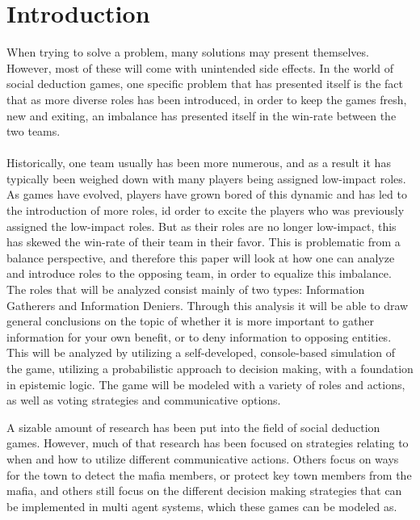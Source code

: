 \section{Introduction}
When trying to solve a problem, many solutions may present themselves. However, 
most of these will come with unintended side effects. In the world of social deduction games, one specific problem that has presented itself is the fact that as more diverse roles has been introduced, in order to keep the games fresh, new and exiting, an imbalance has presented itself in the win-rate between the two teams. \\ \\
Historically, one team usually has been more numerous, and as a result it has typically been weighed down with many players being assigned low-impact roles. As games have evolved, players have grown bored of this dynamic and has led to the introduction of more roles, id order to excite the players who was previously assigned the low-impact roles. But as their roles are no longer low-impact, this has skewed the win-rate of their team in their favor. This is problematic from a balance perspective, and therefore this paper will look at how one can analyze and introduce roles to the opposing team, in order to equalize this imbalance. The roles that will be analyzed consist mainly of two types: Information Gatherers and Information Deniers. Through this analysis it will be able to draw general conclusions on the topic of whether it is more important to gather information for your own benefit, or to deny information to opposing entities. \\

This will be analyzed by utilizing a self-developed, console-based simulation
of the game, utilizing a probabilistic approach to decision making, with a
foundation in epistemic logic. The game will be modeled with a variety of roles and actions, as well as voting strategies and communicative options. 

A sizable amount of research has been put into the field of social deduction
games. However, much of that research has been focused on strategies relating
to when and how to utilize different communicative actions\cite{commitment}.
Others focus on ways for the town to detect the mafia
members\cite{werewolf_stealth}, or protect key town members from the
mafia\cite{werewolf_nash_equilibrium}, and others still focus on the different
decision making strategies that can be implemented in multi agent systems,
which these games can be modeled
as\cite{modelling_multi_agent_epistemic_systems}\cite{multi_agent_epistemic_planner_common_knowledge}\cite{probibalistic_multiagent_systems}.

